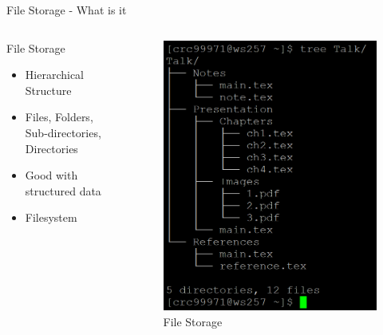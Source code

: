 \begin{frame}{File Storage - What is it }

\begin{columns}
    \begin{column}{0.47\textwidth}
    \begin{block}{File Storage}
        \begin{itemize}
            \item Hierarchical Structure 
            \item Files, Folders, Sub-directories, Directories
            \item Good with structured data 
            \item Filesystem
        \end{itemize}
    \end{block}
    \end{column}
    \begin{column}{0.47\textwidth}
        \begin{figure}
        \centering
        \includegraphics[width=\textwidth,height=0.7\textheight,keepaspectratio]{img/tree.PNG}
        \caption{File Storage}
        \label{fig:my_label}
    \end{figure}
    \end{column}
\end{columns}
\end{frame}


